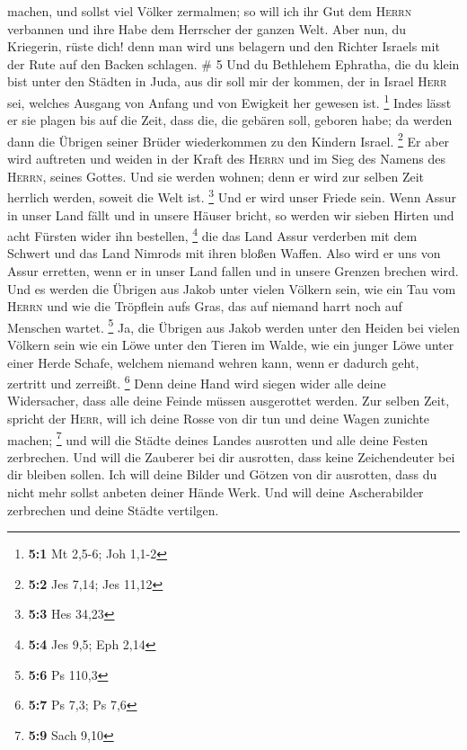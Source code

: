 machen, und sollst viel Völker zermalmen; so will ich ihr Gut dem
\textsc{Herrn} verbannen und ihre Habe dem Herrscher der ganzen Welt.
 Aber nun, du Kriegerin, rüste dich! denn man wird uns
belagern und den Richter Israels mit der Rute auf den Backen schlagen.
\# 5  Und du Bethlehem Ephratha, die du klein bist unter
den Städten in Juda, aus dir soll mir der kommen, der in Israel
\textsc{Herr} sei, welches Ausgang von Anfang und von Ewigkeit her
gewesen ist. \footnote{\textbf{5:1} Mt 2,5-6; Joh 1,1-2} 
Indes lässt er sie plagen bis auf die Zeit, dass die, die gebären soll,
geboren habe; da werden dann die Übrigen seiner Brüder wiederkommen zu
den Kindern Israel. \footnote{\textbf{5:2} Jes 7,14; Jes 11,12}
 Er aber wird auftreten und weiden in der Kraft des
\textsc{Herrn} und im Sieg des Namens des \textsc{Herrn}, seines Gottes.
Und sie werden wohnen; denn er wird zur selben Zeit herrlich werden,
soweit die Welt ist. \footnote{\textbf{5:3} Hes 34,23} 
Und er wird unser Friede sein. Wenn Assur in unser Land fällt und in
unsere Häuser bricht, so werden wir sieben Hirten und acht Fürsten wider
ihn bestellen, \footnote{\textbf{5:4} Jes 9,5; Eph 2,14} 
die das Land Assur verderben mit dem Schwert und das Land Nimrods mit
ihren bloßen Waffen. Also wird er uns von Assur erretten, wenn er in
unser Land fallen und in unsere Grenzen brechen wird.  Und
es werden die Übrigen aus Jakob unter vielen Völkern sein, wie ein Tau
vom \textsc{Herrn} und wie die Tröpflein aufs Gras, das auf niemand
harrt noch auf Menschen wartet. \footnote{\textbf{5:6} Ps 110,3}
 Ja, die Übrigen aus Jakob werden unter den Heiden bei
vielen Völkern sein wie ein Löwe unter den Tieren im Walde, wie ein
junger Löwe unter einer Herde Schafe, welchem niemand wehren kann, wenn
er dadurch geht, zertritt und zerreißt. \footnote{\textbf{5:7} Ps 7,3;
  Ps 7,6}  Denn deine Hand wird siegen wider alle deine
Widersacher, dass alle deine Feinde müssen ausgerottet werden.
 Zur selben Zeit, spricht der \textsc{Herr}, will ich
deine Rosse von dir tun und deine Wagen zunichte machen; \footnote{\textbf{5:9}
  Sach 9,10}  und will die Städte deines Landes ausrotten
und alle deine Festen zerbrechen.  Und will die Zauberer
bei dir ausrotten, dass keine Zeichendeuter bei dir bleiben sollen.
 Ich will deine Bilder und Götzen von dir ausrotten, dass
du nicht mehr sollst anbeten deiner Hände Werk.  Und will
deine Ascherabilder zerbrechen und deine Städte vertilgen.
